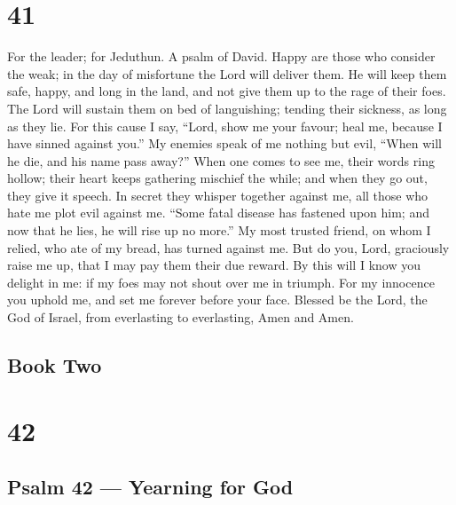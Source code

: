 \hypertarget{section-40}{%
\section{41}\label{section-40}}

For the leader; for Jeduthun. A psalm of David.  Happy are
those who consider the weak; in the day of misfortune the Lord will
deliver them.  He will keep them safe, happy, and long in
the land, and not give them up to the rage of their foes. 
The Lord will sustain them on bed of languishing; tending their
sickness, as long as they lie.  For this cause I say,
``Lord, show me your favour; heal me, because I have sinned against
you.''  My enemies speak of me nothing but evil, ``When will
he die, and his name pass away?''  When one comes to see me,
their words ring hollow; their heart keeps gathering mischief the while;
and when they go out, they give it speech.  In secret they
whisper together against me, all those who hate me plot evil against me.
 ``Some fatal disease has fastened upon him; and now that he
lies, he will rise up no more.''  My most trusted friend, on
whom I relied, who ate of my bread, has turned against me. 
But do you, Lord, graciously raise me up, that I may pay them their due
reward.  By this will I know you delight in me: if my foes
may not shout over me in triumph.  For my innocence you
uphold me, and set me forever before your face.  Blessed be
the Lord, the God of Israel, from everlasting to everlasting, Amen and
Amen.

\hypertarget{book-two}{%
\subsection{Book Two}\label{book-two}}

\hypertarget{section-41}{%
\section{42}\label{section-41}}

\hypertarget{psalm-42-yearning-for-god}{%
\subsection{Psalm 42 --- Yearning for
God}\label{psalm-42-yearning-for-god}}


